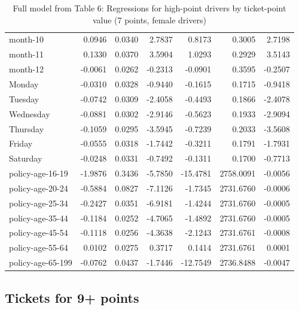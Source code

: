 \documentclass[10pt]{article}
\begin{document}
\begin{table}[ht]
\begin{tabular}{lrrrrrr}
  month-10 & 0.0946 & 0.0340 & 2.7837 & 0.8173 & 0.3005 & 2.7198 \\ 
  month-11 & 0.1330 & 0.0370 & 3.5904 & 1.0293 & 0.2929 & 3.5143 \\ 
  month-12 & -0.0061 & 0.0262 & -0.2313 & -0.0901 & 0.3595 & -0.2507 \\ 
  Monday & -0.0310 & 0.0328 & -0.9440 & -0.1615 & 0.1715 & -0.9418 \\ 
  Tuesday & -0.0742 & 0.0309 & -2.4058 & -0.4493 & 0.1866 & -2.4078 \\ 
  Wednesday & -0.0881 & 0.0302 & -2.9146 & -0.5623 & 0.1933 & -2.9094 \\ 
  Thursday & -0.1059 & 0.0295 & -3.5945 & -0.7239 & 0.2033 & -3.5608 \\ 
  Friday & -0.0555 & 0.0318 & -1.7442 & -0.3211 & 0.1791 & -1.7931 \\ 
  Saturday & -0.0248 & 0.0331 & -0.7492 & -0.1311 & 0.1700 & -0.7713 \\ 
  policy-age-16-19 & -1.9876 & 0.3436 & -5.7850 & -15.4781 & 2758.0091 & -0.0056 \\ 
  policy-age-20-24 & -0.5884 & 0.0827 & -7.1126 & -1.7345 & 2731.6760 & -0.0006 \\ 
  policy-age-25-34 & -0.2427 & 0.0351 & -6.9181 & -1.4244 & 2731.6760 & -0.0005 \\ 
  policy-age-35-44 & -0.1184 & 0.0252 & -4.7065 & -1.4892 & 2731.6760 & -0.0005 \\ 
  policy-age-45-54 & -0.1118 & 0.0256 & -4.3638 & -2.1243 & 2731.6761 & -0.0008 \\ 
  policy-age-55-64 & 0.0102 & 0.0275 & 0.3717 & 0.1414 & 2731.6761 & 0.0001 \\ 
  policy-age-65-199 & -0.0762 & 0.0437 & -1.7446 & -12.7549 & 2736.8488 & -0.0047 \\ 
   \hline
\end{tabular}
\caption{Full model from Table 6: Regressions for high-point drivers by ticket-point value (7 points, female drivers)} 
\label{tab_6_7_pts_F}
\end{table}


\clearpage
\pagebreak




\subsection{Tickets for 9+ points}
\end{document}
